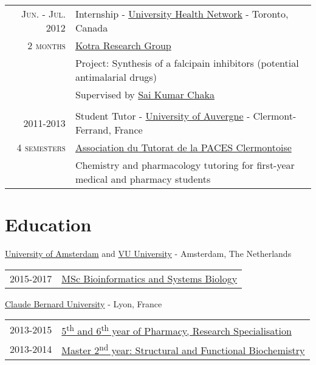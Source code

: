 \documentclass[a4paper, 10pt]{article} %
\begin{document}
\begin{tabular}{r|p{12.5cm}}

\textsc{Jun. - Jul. 2012} & Internship - \href{http://www.uhn.ca/}{University Health Network} - Toronto, Canada \\
\textsc{2 months} & \href{http://kotralab.uhnresearch.ca/}{Kotra Research Group} \\
& \footnotesize{Project: Synthesis of a falcipain inhibitors (potential antimalarial drugs)} \\
& \footnotesize{Supervised by \href{http://www.linkedin.com/in/sai-kumar-chakka-178aa215}{Sai Kumar Chaka}} \\
\multicolumn{2}{c}{} \\


\textsc{2011-2013} & Student Tutor - \href{http://www.u-clermont1.fr/}{University of Auvergne} - Clermont-Ferrand, France \\
\textsc{4 semesters} & \href{https://www.atpclermont.fr/}{Association du Tutorat de la PACES Clermontoise}\\
& \footnotesize{Chemistry and pharmacology tutoring for first-year medical and pharmacy students} \\

\end{tabular}


\section{Education}

\href{http://www.uva.nl/en/home}{University of Amsterdam} and \href{http://www.vu.nl/en/index.aspx}{VU University} - Amsterdam, The Netherlands

\begin{tabular}{ll}
\textsc{2015-2017} & \href{http://gss.uva.nl/future-msc-students/life-and-earth-sciences/content33/systems-biology.html}{MSc Bioinformatics and Systems Biology}
\end{tabular}

\href{http://www.univ-lyon1.fr/en/home-759942.kjsp?RH=WWW-FR}{Claude Bernard University} - Lyon, France

\begin{tabular}{ll}
\textsc{2013-2015} & \href{http://ispb.univ-lyon1.fr/}{5\textsuperscript{th} and 6\textsuperscript{th} year of Pharmacy, Research Specialisation} \\
\textsc{2013-2014} & \href{http://spiralconnect.univ-lyon1.fr/webapp/website/website.html?id=2218791&read=true}{Master 2\textsuperscript{nd} year: Structural and Functional Biochemistry}
\end{tabular}
\end{document}
